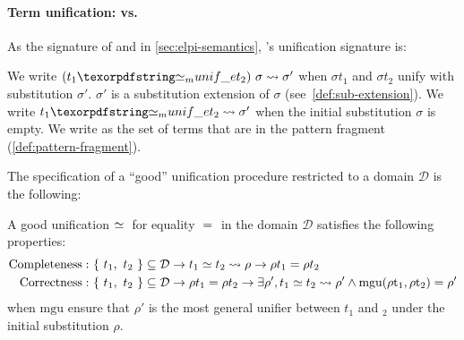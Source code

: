 \paragraph*{Term unification: \Uo vs. \Ue}

As the signature of \unify and \matching in \cref{sec:elpi-semantics}, 
\Ho{}'s unification signature is:
%
% 
\begin{center}  

\end{center}

\noindent
We write 
$(t_1 \Ue t_2)\ \sigma \arr \sigma'$ when
$\sigma t_1$ and $\sigma t_2$ unify with substitution $\sigma'$.
$\sigma'$ is a substitution extension of $\sigma$ (see~\cref{def:sub-extension}).
We write $t_1 \Ue t_2 \arr \sigma'$ when
the initial substitution $\sigma$ is empty.
We write \llambda as the set of terms that are in the pattern fragment
(\cref{def:pattern-fragment}).

The specification of a ``good'' unification procedure restricted
to a domain $\mathcal{D}$ is the following:

\newcommand{\unifcorrectX}[4]{\ensuremath{
   #4 \to
      #3_1 #2 #3_2 \arr \rho
        \to
          \rho #3_1 #1 \rho #3_2  %
}}

\newcommand{\unifcompleteX}[4]{\ensuremath{
    #4 \to
        \rho #3_1 #1 \rho #3_2  %
          \to \exists \rho', #3_1 #2 #3_2 \arr \rho' \land \mathrm{mgu (\rho #3_1, \rho #3_2) = \rho'}
}}

\begin{proposition}\label{prop:good-unif}
A good unification $\simeq\;$ for equality $\;=\;$ in the domain
$\mathcal{D}$ satisfies the following properties:%
  \begin{align}
    \mathrm{Completeness}:\ & \unifcorrectX{\EqualRel}{\UnifRel}{t}{\{~t_1,~ t_2~\} \subseteq \mathcal{D}}\\
    \mathrm{Correctness}:\ & \unifcompleteX{\EqualRel}{\UnifRel}{t}{\{~ t_1,~ t_2 ~\} \subseteq \mathcal{D}}
  \end{align}
when $\mathrm{mgu}$ ensure that $\rho'$ is the most general unifier between $t_1$ and $_2$
under the initial substitution $\rho$.
\end{proposition}  

